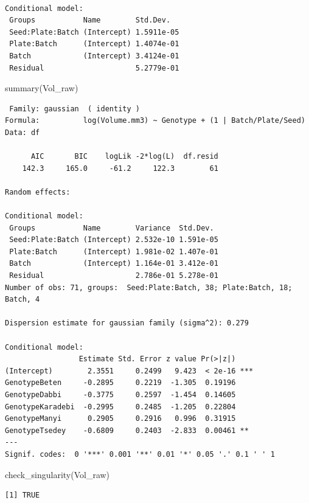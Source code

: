 \documentclass[
  letterpaper,
  DIV=11,
  numbers=noendperiod]{scrartcl}
\newenvironment{Shaded}{\begin{snugshade}}{\end{snugshade}}
\newcommand{\FunctionTok}[1]{\textcolor[rgb]{0.28,0.35,0.67}{#1}}
\newcommand{\NormalTok}[1]{\textcolor[rgb]{0.00,0.23,0.31}{#1}}
\begin{document}
\begin{verbatim}

Conditional model:
 Groups           Name        Std.Dev.  
 Seed:Plate:Batch (Intercept) 1.5911e-05
 Plate:Batch      (Intercept) 1.4074e-01
 Batch            (Intercept) 3.4124e-01
 Residual                     5.2779e-01
\end{verbatim}

\begin{Shaded}
\begin{Highlighting}[]
\FunctionTok{summary}\NormalTok{(Vol\_raw)}
\end{Highlighting}
\end{Shaded}

\begin{verbatim}
 Family: gaussian  ( identity )
Formula:          log(Volume.mm3) ~ Genotype + (1 | Batch/Plate/Seed)
Data: df

      AIC       BIC    logLik -2*log(L)  df.resid 
    142.3     165.0     -61.2     122.3        61 

Random effects:

Conditional model:
 Groups           Name        Variance  Std.Dev. 
 Seed:Plate:Batch (Intercept) 2.532e-10 1.591e-05
 Plate:Batch      (Intercept) 1.981e-02 1.407e-01
 Batch            (Intercept) 1.164e-01 3.412e-01
 Residual                     2.786e-01 5.278e-01
Number of obs: 71, groups:  Seed:Plate:Batch, 38; Plate:Batch, 18; Batch, 4

Dispersion estimate for gaussian family (sigma^2): 0.279 

Conditional model:
                 Estimate Std. Error z value Pr(>|z|)    
(Intercept)        2.3551     0.2499   9.423  < 2e-16 ***
GenotypeBeten     -0.2895     0.2219  -1.305  0.19196    
GenotypeDabbi     -0.3775     0.2597  -1.454  0.14605    
GenotypeKaradebi  -0.2995     0.2485  -1.205  0.22804    
GenotypeManyi      0.2905     0.2916   0.996  0.31915    
GenotypeTsedey    -0.6809     0.2403  -2.833  0.00461 ** 
---
Signif. codes:  0 '***' 0.001 '**' 0.01 '*' 0.05 '.' 0.1 ' ' 1
\end{verbatim}

\begin{Shaded}
\begin{Highlighting}[]
\FunctionTok{check\_singularity}\NormalTok{(Vol\_raw)}
\end{Highlighting}
\end{Shaded}

\begin{verbatim}
[1] TRUE
\end{verbatim}
\end{document}
